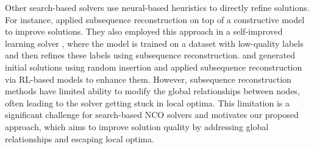 Other search-based solvers use neural-based heuristics to directly refine solutions. 
For instance, \citet{luo2023neural} applied subsequence reconstruction on top of a constructive model to improve solutions. They also employed this approach in a self-improved learning solver \cite{luo2024self}, where the model is trained on a dataset with low-quality labels and then refines these labels using subsequence reconstruction. 
\citet{cheng2023select} and \citet{ye2024glop} generated initial solutions using random insertion and applied subsequence reconstruction via RL-based models to enhance them. 
However, subsequence reconstruction methods have limited ability to modify the global relationships between nodes, often leading to the solver getting stuck in local optima. This limitation is a significant challenge for search-based NCO solvers and motivates our proposed approach, which aims to improve solution quality by addressing global relationships and escaping local optima. 

